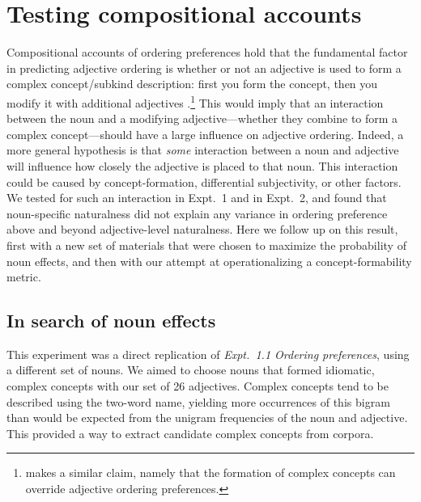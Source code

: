 \documentclass[12pt]{article}
\begin{document}
\section{Testing compositional accounts}

Compositional accounts of ordering preferences hold that the fundamental factor in predicting adjective ordering is whether or not an adjective is used to form a complex concept/subkind description: first you form the concept, then you modify it with additional adjectives \citep{McNally2004,svenonius2008}.\footnote{\cite{bouchard2005} makes a similar claim, namely that the formation of complex concepts can override adjective ordering preferences.} 
This would imply that an interaction between the noun and a modifying adjective---whether they combine to form a complex concept---should have a large influence on adjective ordering. 
Indeed, a more general hypothesis is that \emph{some} interaction between a noun and adjective will influence how closely the adjective is placed to that noun. This interaction could be caused by concept-formation, differential subjectivity, or other factors. We tested for such an interaction in Expt.~1 and in Expt.~2, and found that noun-specific naturalness did not explain any variance in ordering preference above and beyond adjective-level naturalness. %
Here we follow up on this result, first with a new set of materials that were chosen to maximize the probability of noun effects, and then with our attempt at operationalizing a concept-formability metric.

\subsection{In search of noun effects}

This experiment was a direct replication of \emph{Expt.~1.1 Ordering preferences}, using a different set of nouns. We aimed to choose nouns that formed idiomatic, complex concepts with our set of 26 adjectives. Complex concepts tend to be described using the two-word name, yielding more occurrences of this bigram than would be expected from the unigram frequencies of the noun and adjective. This provided a way to extract candidate complex concepts from corpora.
\end{document}
